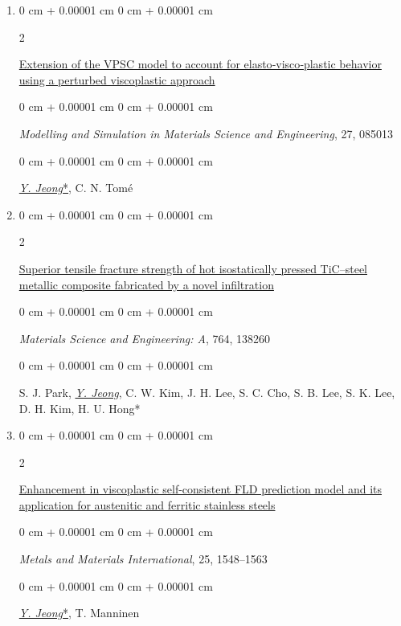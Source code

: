 \documentclass[10pt, letterpaper]{article}
\newenvironment{onecolentry}{
    \begin{adjustwidth}{
        0 cm + 0.00001 cm
    }{
        0 cm + 0.00001 cm
    }
}{
    \end{adjustwidth}
} %
\newenvironment{twocolentry}[2][]{
    \onecolentry
    \def\secondColumn{#2}
    \setcolumnwidth{\fill, 4.5 cm}
    \begin{paracol}{2}
}{
    \switchcolumn \raggedleft \secondColumn
    \end{paracol}
    \endonecolentry
} %
\begin{document}
\begin{enumerate}
        \item
        \begin{twocolentry}{2019}
            \href{https://doi.org/10.1088/1361-651X/ab4b66}{Extension of the VPSC model to account for elasto‑visco‑plastic behavior using a
            perturbed viscoplastic approach}
        \end{twocolentry}
        \begin{onecolentry}
            {\it Modelling and Simulation in Materials Science and Engineering}, 27, 085013
        \end{onecolentry}
        \begin{onecolentry}
            {\underline{\textit{Y. Jeong}*}}, C. N. Tomé
        \end{onecolentry}
        \vspace{0.10 cm}


        \item
        \begin{twocolentry}{2019}
            \href{https://doi.org/10.1016/j.msea.2019.138260}{Superior tensile fracture strength of hot isostatically pressed TiC–steel metallic composite fabricated by a novel infiltration}
        \end{twocolentry}
        \begin{onecolentry}
            {\it Materials Science and Engineering: A}, 764, 138260
        \end{onecolentry}
        \begin{onecolentry}
            S. J. Park, {\underline{\textit{Y. Jeong}}}, C. W. Kim, J. H. Lee, S. C. Cho, S. B. Lee, S. K. Lee, D. H. Kim, H. U. Hong*
        \end{onecolentry}
        \vspace{0.10 cm}



        \item
        \begin{twocolentry}{2019}
            \href{https://doi.org/10.1007/s12540-019-00292-5}{Enhancement in viscoplastic self-consistent FLD prediction model and its application for austenitic and ferritic stainless steels}
        \end{twocolentry}
        \begin{onecolentry}
            {\it Metals and Materials International}, 25, 1548–1563
        \end{onecolentry}
        \begin{onecolentry}
            {\underline{\textit{Y. Jeong}*}}, T. Manninen
        \end{onecolentry}
        \vspace{0.10 cm}




\end{enumerate}
\end{document}
